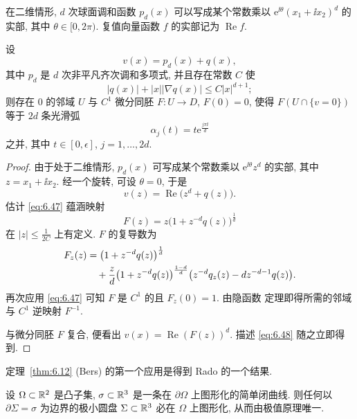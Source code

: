 在二维情形, $d$ 次球面调和函数 $p_d(x)$ 可以写成某个常数乘以
$\mathrm{e}^{\ii\theta}(x_1+\ii x_2)^d$ 的实部, 其中 $\theta\in[0,2\pi)$.
复值向量函数 $f$ 的实部记为 $\operatorname{Re}f$.

\begin{lemma}
\label{lem:6.13}
设
\begin{equation}
v(x)=p_d(x)+q(x),
\label{eq:6.46}
\end{equation}
其中 $p_d$ 是 $d$ 次非平凡齐次调和多项式, 并且存在常数 $C$ 使
\begin{equation}
|q(x)|+|x||\nabla q(x)|\leq C|x|^{d+1};
\label{eq:6.47}
\end{equation}
则存在 $0$ 的邻域 $U$ 与 $C^1$ 微分同胚 $F:U\to D$, $F(0)=0$, 使得
$F(U\cap\{v=0\})$ 等于 $2d$ 条光滑弧
\begin{equation}
\alpha_j(t)=t\mathrm{e}^{\frac{j\pi\ii}{d}}
\label{eq:6.48}
\end{equation}
之并, 其中 $t\in[0,\epsilon]$, $j=1,\ldots,2d$.
\end{lemma}

\begin{proof}
由于处于二维情形, $p_d(x)$ 可写成某个常数乘以 $\mathrm{e}^{\ii\theta}z^d$
的实部, 其中 $z=x_1+\ii x_2$. 经一个旋转, 可设 $\theta=0$, 于是
\begin{equation}
v(z)=\operatorname{Re}\bigl(z^d+q(z)\bigr).
\label{eq:6.49}
\end{equation}
估计 \eqref{eq:6.47} 蕴涵映射
\begin{equation}
F(z)=z\bigl(1+z^{-d}q(z)\bigr)^{\frac1d}
\label{eq:6.50}
\end{equation}
在 $|z|\leq\frac{1}{2C}$ 上有定义. $F$ 的复导数为
\begin{align}
F_z(z)&=\bigl(1+z^{-d}q(z)\bigr)^{\frac1d}\notag\\
&\quad+\frac{z}{d}\bigl(1+z^{-d}q(z)\bigr)^{\frac{1-d}{d}}
\bigl(z^{-d}q_z(z)-dz^{-d-1}q(z)\bigr).
\label{eq:6.51}
\end{align}
再次应用 \eqref{eq:6.47} 可知 $F$ 是 $C^1$ 的且 $F_z(0)=1$. 由隐函数
定理即得所需的邻域与 $C^1$ 逆映射 $F^{-1}$.

与微分同胚 $F$ 复合, 便看出 $v(x)=\operatorname{Re}(F(z))^d$. 描述
\eqref{eq:6.48} 随之立即得到.
\end{proof}

定理~\ref{thm:6.12} (Bers) 的第一个应用是得到 Rado 的一个结果.

\begin{theorem}
\label{thm:6.14}
设 $\Omega\subset\mathbb{R}^2$ 是凸子集, $\sigma\subset\mathbb{R}^3$ 是一条在 $\partial\Omega$
上图形化的简单闭曲线. 则任何以 $\partial\Sigma=\sigma$ 为边界的极小圆盘
$\Sigma\subset\mathbb{R}^3$ 必在 $\Omega$ 上图形化, 从而由极值原理唯一.
\end{theorem}

